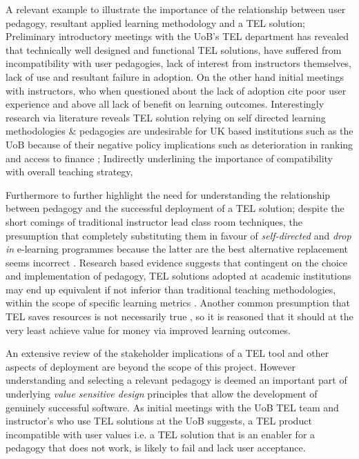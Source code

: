 A relevant example to illustrate the importance of the relationship between user pedagogy, resultant applied learning methodology and a TEL solution; Preliminary introductory meetings with the UoB's TEL department has revealed that technically well designed and functional TEL solutions, have suffered from incompatibility with user pedagogies, lack of interest from instructors themselves, lack of use and resultant failure in adoption. On the other hand initial meetings with instructors, who when questioned about the lack of adoption cite poor user experience and above all lack of benefit on learning outcomes. Interestingly research via literature reveals TEL solution relying on self directed learning methodologies \& pedagogies are undesirable for UK based institutions such as the UoB because of their negative policy implications such as deterioration in ranking and access to finance \cite{Gordon2014}; Indirectly underlining the importance of compatibility with overall teaching strategy,

Furthermore to further highlight the need for understanding the relationship between pedagogy and the successful deployment of a TEL solution; despite the short comings of traditional instructor lead class room techniques,  the presumption that  completely substituting them in favour of \textit{self-directed} and \textit{drop in} e-learning programmes because the latter are the  best alternative replacement seems incorrect \cite{RickReis,Team2008} . Research based evidence suggests that contingent on the choice and implementation of pedagogy,  TEL solutions adopted at academic institutions may end up equivalent if not inferior than traditional teaching   methodologies, within the scope of specific learning metrics \cite{RickReis,Means2009,Team2008}. Another common presumption that TEL saves resources is not necessarily true \cite{Gordon2014,Hackelbusch2007}, so it is reasoned that it should at the very least achieve value for money via improved learning outcomes.

An extensive review of the stakeholder implications of a TEL tool and other aspects of deployment are beyond the scope of this project. However understanding and selecting a relevant pedagogy is deemed an important part of underlying \textit{value sensitive design} \cite{Mahamuni2015} principles that allow the development of genuinely successful software. As initial meetings with the UoB TEL team and instructor's who use TEL solutions at the UoB suggests, a TEL product incompatible with user values i.e. a TEL solution that is an enabler for a pedagogy that does not work, is likely to fail and lack user acceptance.



